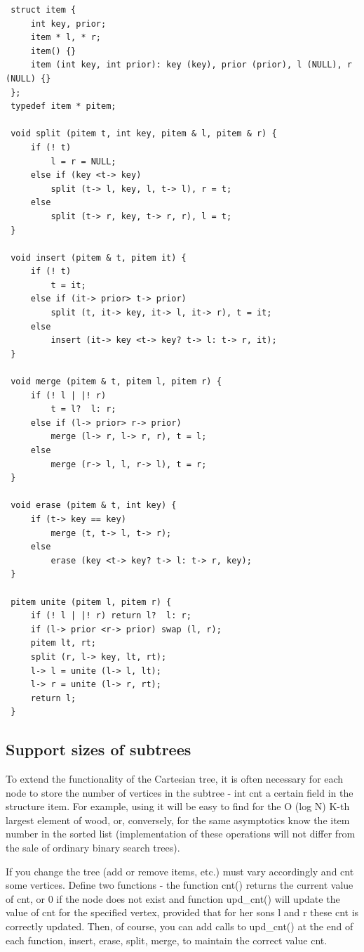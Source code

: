 \begin{verbatim}
 struct item {
     int key, prior;
     item * l, * r;
     item() {}
     item (int key, int prior): key (key), prior (prior), l (NULL), r (NULL) {}
 };
 typedef item * pitem;

 void split (pitem t, int key, pitem & l, pitem & r) {
     if (! t)
         l = r = NULL;
     else if (key <t-> key)
         split (t-> l, key, l, t-> l), r = t;
     else
         split (t-> r, key, t-> r, r), l = t;
 }

 void insert (pitem & t, pitem it) {
     if (! t)
         t = it;
     else if (it-> prior> t-> prior)
         split (t, it-> key, it-> l, it-> r), t = it;
     else
         insert (it-> key <t-> key? t-> l: t-> r, it);
 }

 void merge (pitem & t, pitem l, pitem r) {
     if (! l | |! r)
         t = l?  l: r;
     else if (l-> prior> r-> prior)
         merge (l-> r, l-> r, r), t = l;
     else
         merge (r-> l, l, r-> l), t = r;
 }

 void erase (pitem & t, int key) {
     if (t-> key == key)
         merge (t, t-> l, t-> r);
     else
         erase (key <t-> key? t-> l: t-> r, key);
 }

 pitem unite (pitem l, pitem r) {
     if (! l | |! r) return l?  l: r;
     if (l-> prior <r-> prior) swap (l, r);
     pitem lt, rt;
     split (r, l-> key, lt, rt);
     l-> l = unite (l-> l, lt);
     l-> r = unite (l-> r, rt);
     return l;
 } 
\end{verbatim}\subsection{ Support sizes of subtrees }
To extend the functionality of the Cartesian tree, it is often necessary for each node to store the number of vertices in the subtree - int cnt a certain field in the structure item. For example, using it will be easy to find for the O (log N) K-th largest element of wood, or, conversely, for the same asymptotics know the item number in the sorted list (implementation of these operations will not differ from the sale of ordinary binary search trees).

If you change the tree (add or remove items, etc.) must vary accordingly and cnt some vertices. Define two functions - the function cnt() returns the current value of cnt, or 0 if the node does not exist and function upd\_cnt() will update the value of cnt for the specified vertex, provided that for her sons l and r these cnt is correctly updated. Then, of course, you can add calls to upd\_cnt() at the end of each function, insert, erase, split, merge, to maintain the correct value cnt.

